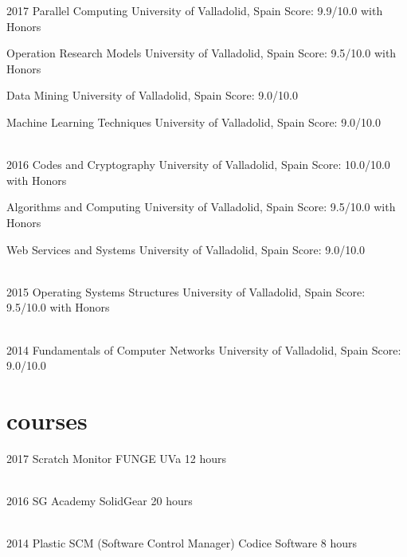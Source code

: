 \documentclass{friggeri-cv}
\begin{document}
    \begin{entrylist}

      \entry
      {2017}
      {Parallel Computing}
      {University of Valladolid, Spain}
      {Score: 9.9/10.0 with Honors}

      \entry
      {}
      {Operation Research Models}
      {University of Valladolid, Spain}
      {Score: 9.5/10.0 with Honors}

      \entry
      {}
      {Data Mining}
      {University of Valladolid, Spain}
      {Score: 9.0/10.0}

      \entry
      {}
      {Machine Learning Techniques}
      {University of Valladolid, Spain}
      {Score: 9.0/10.0}

      \\
      \entry
      {2016}
      {Codes and Cryptography}
      {University of Valladolid, Spain}
      {Score: 10.0/10.0 with Honors}

      \entry
      {}
      {Algorithms and Computing}
      {University of Valladolid, Spain}
      {Score: 9.5/10.0 with Honors}

      \entry
      {}
      {Web Services and Systems}
      {University of Valladolid, Spain}
      {Score: 9.0/10.0}

      \\
      \entry
      {2015}
      {Operating Systems Structures}
      {University of Valladolid, Spain}
      {Score: 9.5/10.0 with Honors}

      \\
      \entry
      {2014}
      {Fundamentals of Computer Networks}
      {University of Valladolid, Spain}
      {Score: 9.0/10.0}

    \end{entrylist}



  \section{courses}

    \begin{entrylist}

      \entry
      {2017}
      {Scratch Monitor}
      {FUNGE UVa}
      {12 hours}

      \\
      \entry
      {2016}
      {SG Academy}
      {SolidGear}
      {20 hours}

      \\
      \entry
      {2014}
      {Plastic SCM (Software Control Manager)}
      {Codice Software}
      {8 hours}

    \end{entrylist}
\end{document}
